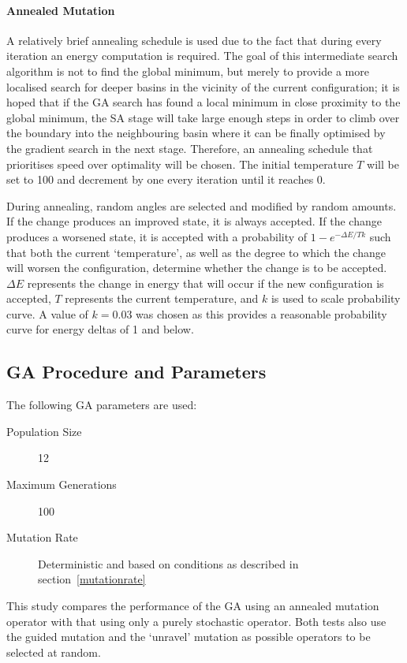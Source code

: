 \documentclass{article}
\begin{document}
\paragraph{Annealed Mutation}

A relatively brief annealing schedule is used due to the fact that during every
iteration an energy computation is required. The goal of this intermediate
search algorithm is not to find the global minimum, but merely to provide a more
localised search for deeper basins in the vicinity of the current configuration;
it is hoped that if the GA search has found a local minimum in close proximity
to the global minimum, the SA stage will take large enough steps in order to
climb over the boundary into the neighbouring basin where it can be finally
optimised by the gradient search in the next stage. Therefore, an annealing
schedule that prioritises speed over optimality will be chosen. The initial
temperature $T$ will be set to 100 and decrement by one every iteration until it
reaches 0.

During annealing, random angles are selected and modified by random amounts. If
the change produces an improved state, it is always accepted. If the change
produces a worsened state, it is accepted with a probability of $1 - e^{-\Delta
E / Tk}$ such that both the current `temperature', as well as the degree to which
the change will worsen the configuration, determine whether the change is to be
accepted. $\Delta E$ represents the change in energy that will occur if the new
configuration is accepted, $T$ represents the current temperature, and $k$ is
used to scale probability curve. A value of $k=0.03$ was chosen as this provides
a reasonable probability curve for energy deltas of 1 and below.

\subsection{GA Procedure and Parameters}

The following GA parameters are used:
\begin{description}
	\item[Population Size] 12
	\item[Maximum Generations] 100
	\item[Mutation Rate] Deterministic and based on conditions as described in
	section~\ref{mutationrate}
\end{description}
This study compares the performance of the GA using an annealed mutation
operator with that using only a purely stochastic operator. Both tests also use
the guided mutation and the `unravel' mutation as possible operators to be
selected at random.
\end{document}
